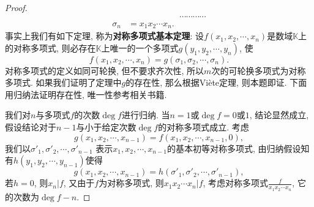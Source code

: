 \begin{1b}
\begin{enumerate}
\begin{proof}
\[\begin{split}
&\qquad\qquad\qquad\cdots\cdots\cdots\cdots\\
\sigma_n&=x_1x_2\cdots x_n.
\end{split}\]
事实上我们有如下定理, 称为\textbf{对称多项式基本定理}: 
设\(f(x_1,x_2,\cdots,x_n)\)是数域\(\mathbb{K}\)上的对称多项式, 
则必存在\(\mathbb{K}\)上唯一的一个多项式\(g(y_1,y_2,\cdots,y_n)\), 使
\[f(x_1,x_2,\cdots,x_n)=g(\sigma_1,\sigma_2,\cdots,\sigma_n).\]
对称多项式的定义如同可轮换, 但不要求齐次性, 所以\(m\)次的可轮换多项式为对称多项式. 
如果我们证明了定理中\(g\)的存在性, 那么根据Vi\`{e}te定理, 则本题即证. 
下面用归纳法证明存在性, 唯一性参考相关书籍.

我们对\(n\)与多项式\(f\)的次数\(\deg f\)进行归纳. 
当\(n=1\)或\(\deg f=0\)或\(1\), 结论显然成立, 
假设结论对于\(n-1\)与小于给定次数\(\deg f\)的对称多项式成立. 考虑
\[g(x_1,x_2,\cdots,x_{n-1})=f(x_1,x_2,\cdots,x_{n-1},0),\]
我们以\(\sigma'_1,\sigma'_2,\cdots,\sigma'_{n-1}\)
表示\(x_1,x_2,\cdots,x_{n-1}\)的基本初等对称多项式, 
由归纳假设知有\(h(y_1,y_2,\cdots,y_{n-1})\)使得
\[g(x_1,x_2,\cdots,x_{n-1})=h(\sigma'_1,\sigma'_2,\cdots,\sigma'_{n-1}),\]
若\(h=0\), 则\(x_n\big| f\), 又由于\(f\)为对称多项式, 则\(x_1x_2\cdots x_n\big| f\), 考虑对称多项式\(\frac{f}{x_1x_2\cdots x_n}\), 它的次数为\(\deg f -n\). 


\end{proof}
\end{enumerate}
\end{1b}
